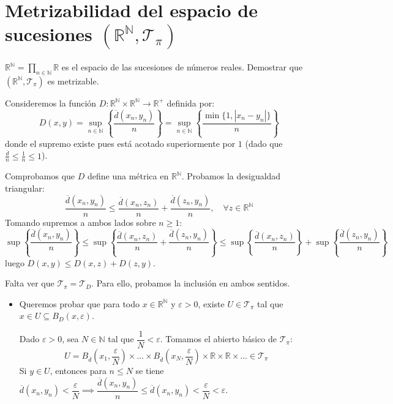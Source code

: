 \section{Metrizabilidad del espacio de sucesiones $(\mathbb{R}^\mathbb{N}, \mathcal{T}_\pi)$}

\begin{teo}
$\mathbb{R}^\mathbb{N} = \prod_{n \in \mathbb{N}} \mathbb{R}$ es el espacio de las sucesiones de números reales. Demostrar que $(\mathbb{R}^\mathbb{N}, \mathcal{T}_\pi)$ es metrizable.
\end{teo}

\begin{dem}
Consideremos la función $D: \mathbb{R}^\mathbb{N} \times \mathbb{R}^\mathbb{N} \longrightarrow \mathbb{R}^+$ definida por:
\[
D(x,y) = \sup_{n \in \mathbb{N}} \left\{ \frac{\overline{d}(x_n, y_n)}{n} \right\} = \sup_{n \in \mathbb{N}} \left\{ \frac{\min\{1, |x_n - y_n|\}}{n} \right\}
\]
donde el supremo existe pues está acotado superiormente por $1$ (dado que $\frac{\overline{d}}{n} \le \frac{1}{n} \le 1$).

Comprobamos que $D$ define una métrica en $\mathbb{R}^\mathbb{N}$. Probamos la desigualdad triangular:
\[
\frac{\overline{d}(x_n, y_n)}{n} \le \frac{\overline{d}(x_n, z_n)}{n} + \frac{\overline{d}(z_n, y_n)}{n}, \quad \forall z \in \mathbb{R}^\mathbb{N}
\]
Tomando supremos a ambos lados sobre $n \ge 1$:
\[
\sup \left\{ \frac{\overline{d}(x_n, y_n)}{n} \right\} \le \sup \left\{ \frac{\overline{d}(x_n, z_n)}{n} + \frac{\overline{d}(z_n, y_n)}{n} \right\} \le \sup \left\{ \frac{\overline{d}(x_n, z_n)}{n} \right\} + \sup \left\{ \frac{\overline{d}(z_n, y_n)}{n} \right\}
\]
luego $D(x,y) \le D(x,z) + D(z,y)$.

\medskip

Falta ver que $\mathcal{T}_\pi = \mathcal{T}_D$. Para ello, probamos la inclusión en ambos sentidos.
\begin{itemize}
\item[$\boxed{\supseteq}$] Queremos probar que para todo $x \in \mathbb{R}^\mathbb{N}$ y $\varepsilon > 0$, existe $U \in \mathcal{T}_\pi$ tal que $x \in U \subseteq B_D(x, \varepsilon)$.

Dado $\varepsilon > 0$, sea $N \in \mathbb{N}$ tal que $\dfrac{1}{N} < \varepsilon$. Tomamos el abierto básico de $\mathcal{T}_\pi$:
\[
U = B_{\overline{d}}\left(x_1, \frac{\varepsilon}{N}\right) \times \dots \times B_{\overline{d}}\left(x_N, \frac{\varepsilon}{N}\right) \times \mathbb{R} \times \mathbb{R} \times \dots \in \mathcal{T}_\pi
\]
Si $y \in U$, entonces para $n \le N$ se tiene $\overline{d}(x_n, y_n) < \dfrac{\varepsilon}{N} \implies \dfrac{\overline{d}(x_n, y_n)}{n} \le \overline{d}(x_n, y_n) < \dfrac{\varepsilon}{N} < \varepsilon$. 


\end{itemize}
\end{dem}
